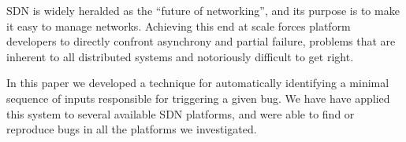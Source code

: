 SDN is widely heralded as the ``future of networking'', and its purpose is to make
it easy to manage networks. Achieving this end at scale forces platform developers to directly
confront asynchrony and partial failure, problems that are inherent to all distributed
systems and notoriously difficult to get right.

In this paper we developed a technique for automatically
identifying a minimal sequence of inputs responsible for triggering a given bug.
We have have applied this system to several available SDN platforms, and
were able to find or reproduce bugs in all the platforms we investigated.



